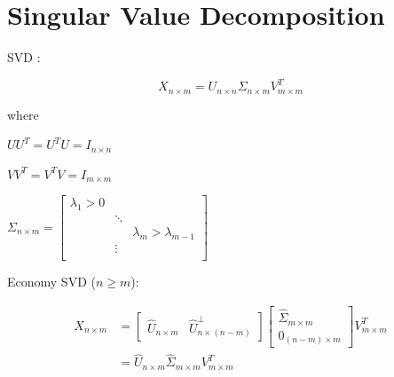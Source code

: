\documentclass{blog}
\begin{document}
\section{Singular Value Decomposition}
\begin{definition}
    SVD \cite{BRUNTON_2022_DATA_DRIVEN_SCIENCE_AND_ENGINEERING_MACHINE_LEARNING_DYNAMICAL_SYSTEMS_AND_CONTROL}:

    \begin{equation}
        \label{eq:svd}
        X_{n \times m} = U_{n \times n}\Sigma_{n \times m}V_{m \times m}^{T}
    \end{equation}

    where

    $UU^{T} = U^{T}U = I_{n \times n}$

    $VV^{T} = V^{T}V = I_{m \times m}$

    $\Sigma_{n \times m} = \begin{bmatrix} \lambda_{1}>0 & & \\ & \ddots & \\ & & \lambda_{m}>\lambda_{m-1} \\ & \vdots & \\ \end{bmatrix}$
\end{definition}

\begin{definition}
    Economy SVD ($n \geq m$):

    \begin{equation}
        \label{eq:economy-svd}
        \begin{aligned}
            X_{n \times m} & = \begin{bmatrix}\hat{U}_{n \times m} & \hat{U}_{n \times (n-m)}^{\perp}\end{bmatrix}
            \begin{bmatrix}\hat{\Sigma}_{m \times m} \\ 0_{(n-m) \times m}\end{bmatrix}
            V_{m \times m}^{T}                                                                                     \\
                           & = \hat{U}_{n \times m} \hat{\Sigma}_{m \times m} V_{m \times m}^{T}
        \end{aligned}
    \end{equation}
\end{definition}
\end{document}
